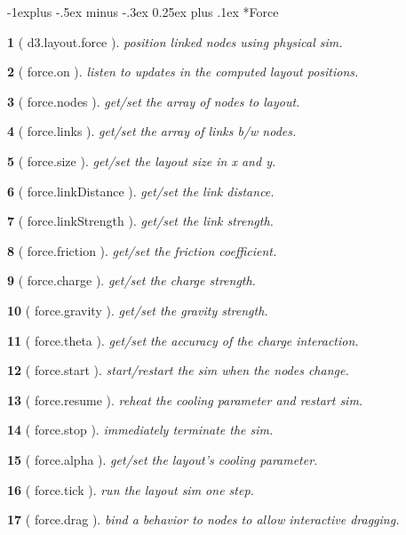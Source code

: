 \documentclass[10pt,landscape,letterpaper]{article}
\makeatletter
\newcounter{thm}
\newcommand{\hdrule}{\vspace{-4pt} \hdashrule[0.25ex]{\fill}{.5pt}{1pt}\vspace{-4pt}}
\theoremstyle{mytheoremstyle}
\newtheorem*{thm}{}
\renewcommand{\subsection}{\@startsection{subsection}{2}{0mm}%
                                {-1explus -.5ex minus -.3ex}%
                                {0.25ex plus .1ex}%
                                {\normalfont\normalsize\bfseries}}
\makeatother
\begin{document}
\begin{multicols}{3}
\subsection*{Force}

\begin{thm} [ d3.layout.force ]  position linked nodes using physical sim.
\end{thm}\begin{thm} [ force.on ]  listen to updates in the computed layout positions.
\end{thm}\begin{thm} [ force.nodes ]  get/set the array of nodes to layout.
\end{thm}\begin{thm} [ force.links ]  get/set the array of links b/w nodes.
\end{thm}\begin{thm} [ force.size ]  get/set the layout size in x and y.
\end{thm}\begin{thm} [ force.linkDistance ]  get/set the link distance.
\end{thm}\begin{thm} [ force.linkStrength ]  get/set the link strength.
\end{thm}\begin{thm} [ force.friction ]  get/set the friction coefficient.
\end{thm}\begin{thm} [ force.charge ]  get/set the charge strength.
\end{thm}\begin{thm} [ force.gravity ]  get/set the gravity strength.
\end{thm}\begin{thm} [ force.theta ]  get/set the accuracy of the charge interaction.
\end{thm}\begin{thm} [ force.start ]  start/restart the sim when the nodes change.
\end{thm}\begin{thm} [ force.resume ]  reheat the cooling parameter and restart sim.
\end{thm}\begin{thm} [ force.stop ]  immediately terminate the sim.
\end{thm}\begin{thm} [ force.alpha ]  get/set the layout's cooling parameter.
\end{thm}\begin{thm} [ force.tick ]  run the layout sim one step.
\end{thm}\begin{thm} [ force.drag ]  bind a behavior to nodes to allow interactive dragging.\end{thm}
\hdrule

\end{multicols}
\end{document}
